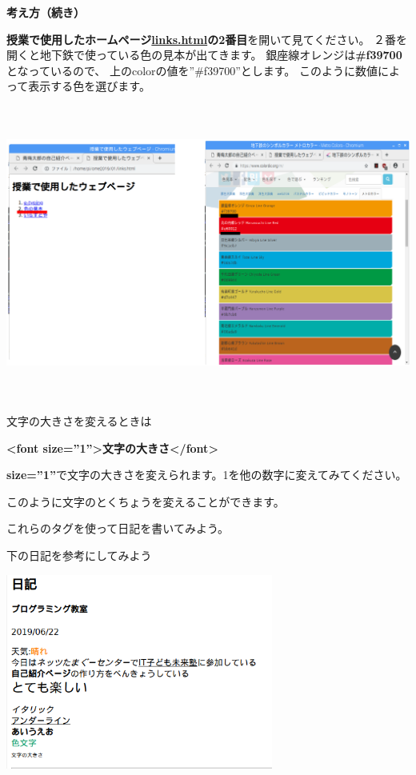 \documentclass[a4paper,12pt]{jarticle}
\begin{document}
\clearpage
\textbf{考え方（続き）}



\textbf{授業で使用したホームページ\url{links.html}の2番目}を開いて見てください。
２番を開くと地下鉄で使っている色の見本が出てきます。
銀座線オレンジは\textbf{\#f39700}となっているので、
上のcolorの値を”\#f39700”とします。
このように数値によって表示する色を選びます。



\bigskip

\includegraphics[width=16.39cm,height=9.698cm]{textbook-img187.png}

文字の大きさを変えるときは

\textbf{{\textless}font size=”1”{\textgreater}文字の大きさ{\textless}/font{\textgreater}}

\textbf{size=”1”}で文字の大きさを変えられます。1を他の数字に変えてみてください。

このように文字のとくちょうを変えることができます。


\bigskip

これらのタグを使って日記を書いてみよう。

下の日記を参考にしてみよう


\bigskip

\includegraphics[width=8.779cm,height=6.412cm]{textbook-img185.png}
\end{document}
